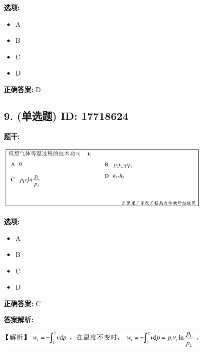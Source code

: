 \documentclass[12pt]{article}
\begin{document}
\textbf{选项:}
\begin{itemize}[leftmargin=*]
  \item A

  \item B

  \item C

  \item D

\end{itemize}

\textbf{正确答案:}
D

\vspace{0.5em}\hrulefill\vspace{1em}

\subsection*{9. (单选题) \small ID: 17718624}

\textbf{题干:}


\begin{center}\includegraphics[width=0.8\textwidth, height=0.25\textheight, keepaspectratio]{question_9_17718624/title_img_1.png}\end{center}

\textbf{选项:}
\begin{itemize}[leftmargin=*]
  \item A

  \item B

  \item C

  \item D

\end{itemize}

\textbf{正确答案:}
C

\textbf{答案解析:}


\begin{center}\includegraphics[width=0.8\textwidth, height=0.25\textheight, keepaspectratio]{question_9_17718624/correct_replay_img_1.png}\end{center}
\end{document}
